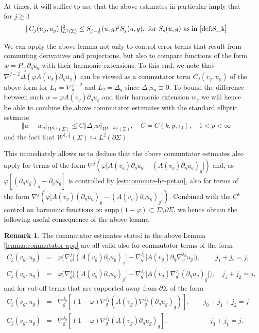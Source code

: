 \documentclass[10pt,reqno]{amsart}
\theoremstyle{plain}
\theoremstyle{definition}
\newtheorem{rmk}[lemma]{Remark}
\numberwithin{equation}{section}
\newcommand{\Si}{\Sigma}
\newcommand{\vph}{\varphi}
\newcommand{\norm}[1]{\Vert#1\Vert}
\newcommand{\beq}{\begin{equation}}
\newcommand{\eeq}{\end{equation}}
\newcommand{\half}{\frac{1}{2}}
\newcommand{\na}{\nabla}
\newcommand{\pSi}{{\partial \Sigma}}
\newcommand{\supp}{\text{supp}}
\newcommand{\p}{\partial} %
\newcommand{\peta}{\partial_\eta}
\begin{document}
At times, it will suffice to use that the above estimates in particular imply that for $j \geq 3$
\beq \label{est:L^2-commut-weaker}
\norm{C_j(u_g,u_g)}_{L^2(\Si)}^2\leq S_{j-\half}(u,g)^{j}S_j(u,g), \text{ for } S_s(u,g) \text{ as in \eqref{def:S_k}}
\eeq

We can apply the above lemma not only to control error terms that result from commuting derivatives and projections, but also to compare functions of the form $w=P_{v_g}\peta u_g$ with their harmonic extensions. 
To this end, we note that  $\na^{j-2} \Delta (\varphi A(v_g) \peta u_g)$ can be viewed as a commutator term
$C_{j}(v_g,u_g)$ of the above form for 
 $L_1=\na_g^{j-2}
$ and $L_2=\Delta_g$ since $\Delta_g u_g \equiv 0$. 
To bound the difference between such $w=\varphi A(v_g)\peta u_g $ and their harmonic extension $w_g$ we will hence be able to combine the above commutator estimates with the standard
elliptic estimate 
\beq\label{est:diff-extension-sigma}
    \norm{w-w_g}_{W^{k,p}(\Si)}\leq C\norm{\Delta_g w}_{W^{k-2,p}(\Si)}, \quad C=C(k,p,\iota_0), \quad 1<p<\infty
\eeq and the fact that  $W^{1,\frac{4}{3}}(\Si)
\hookrightarrow L^2(\pSi)$. 

This immediately allows us to deduce that the above commutator estimates also apply for 
terms of the form $\na^j( \varphi \big[ A(v_g)\peta u_g-(A(v_g)\peta u_g)_g\big] )$
and, as $\varphi[(\peta u_g)_g-\peta u_g]$ is controlled by \eqref{est:commute-he-petau}, also for terms of the form $\na^j( \varphi \big[ A(v_g)(\peta u_g)_g-(A(v_g)\peta u_g)_g\big] )$. 
Combined with the $C^k$ control on harmonic functions on $\supp(1-\vph)\subset \Si\setminus \pSi$, 
we hence obtain the following useful consequence of the above lemma.

\begin{rmk}\label{rmk:extra-commutator-app}
    The commutator estimates stated in the above Lemma \ref{lemma:commutator-app} are all valid also for commutator terms of the form 
\begin{eqnarray}
    \label{def:comm-rmk-1}
C_j(v_g,u_g)&=&\varphi\big(
    \na_g^{j}\big[(A(v_g)\peta u_g)_g\big]-\na_g^{j_1} \big[A(v_g) \peta \na_g^{j_2} u_g\big]\big), \qquad \, j_1+j_2=j,
   \\
   \label{def:comm-rmk-2}
   C_j(v_g,u_g)&=&\vph \big(
    \na_g^{j}\big[(A(v_g)\peta u_g)_g\big]-\na_g^{j_1} \big[A(v_g) \na_g^{j_2} (\peta  u_g)_g\big]\big), \quad j_1+j_2=j,
\end{eqnarray} 
    and for cut-off terms that are supported away from $\pSi$ of the form 
      \begin{eqnarray}
      \label{def:comm-rmk-3-1}
        C_j(v_g,u_g) &=& \nabla_g^{j_0} \left[(1-\vph) \na_g^{j_1} (A(v_g)\na_g^{j_2}(\p_\eta u_g)_g )\right]
    , \qquad
        j_0+j_1+j_2=j\\
        \label{def:comm-rmk-3-2}
        C_j(v_g,u_g) &=& \nabla_g^{j_0} \left[(1-\vph) \na_g^{j_1} (A(v_g)\p_\eta u_g)_g \right], \qquad\qquad\, \qquad j_0+j_1=j.
    \end{eqnarray}
\end{rmk}
\end{document}

